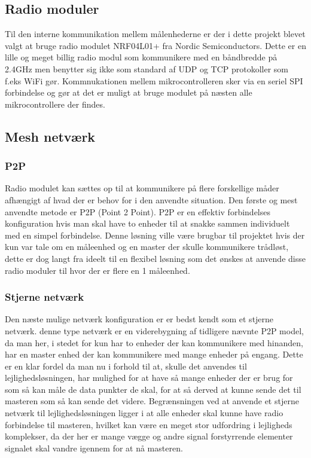 \subsection{Radio moduler}
Til den interne kommunikation mellem målenhederne er der i dette projekt blevet valgt at bruge radio modulet NRF04L01+ fra Nordic Semiconductors.
\newline
Dette er en lille og meget billig radio modul som kommunikere med en båndbredde på 2.4GHz men benytter sig ikke som standard af UDP og TCP protokoller som f.eks WiFi gør. 
Kommnukationen mellem mikrocontrolleren sker via en seriel SPI forbindelse og gør at det er muligt at bruge modulet på næsten alle mikrocontrollere der findes.

\subsection{Mesh netværk}
\subsubsection*{P2P}
Radio modulet kan sættes op til at kommunikere på flere forskellige måder afhængigt af hvad der er behov for i den anvendte situation.
Den første og mest anvendte metode er P2P (Point 2 Point).
\newline
P2P er en effektiv forbindelses konfiguration hvis man skal have to enheder til at snakke sammen individuelt med en simpel forbindelse. Denne løsning ville være brugbar til projektet hvis der kun var tale om en måleenhed og en master der skulle kommunikere trådløst, dette er dog langt fra ideelt til en flexibel løsning som det ønskes at anvende disse radio moduler til hvor der er flere en 1 måleenhed.

\subsubsection*{Stjerne netværk}
Den næste mulige netværk konfiguration er er bedst kendt som et stjerne netværk. denne type netværk er en viderebygning af tidligere nævnte P2P model, da man her, i stedet for kun har to enheder der kan kommunikere med hinanden, har en master enhed der kan kommunikere med mange enheder på engang. Dette er en klar fordel da man nu i forhold til at, skulle det anvendes til lejlighedsløsningen, har mulighed for at have så mange enheder der er brug for som så kan måle de data punkter de skal, for at så derved at kunne sende det til masteren som så kan sende det videre.
\newline
Begrænsningen ved at anvende et stjerne netværk til lejlighedsløsningen ligger i at alle enheder skal kunne have radio forbindelse til masteren, hvilket kan være en meget stor udfordring i lejligheds komplekser, da der her er mange vægge og andre signal forstyrrende elementer signalet skal vandre igennem for at nå masteren.

